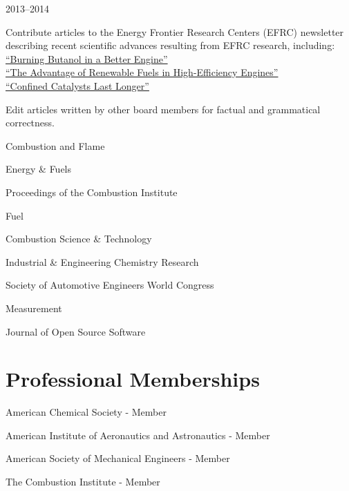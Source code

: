 \begin{lonelist}
\item[]  \hfill 2013--2014\\

\begin{innerlist}
\item Contribute articles to the Energy Frontier Research Centers (EFRC)
newsletter describing recent scientific advances resulting from
EFRC research, including:\\
\hspace*{0.25in}\href{http://www.energyfrontier.us/newsletter/201210/burning-butanol-better-engine}
{``Burning Butanol in a Better Engine''}\\
\hspace*{0.25in}\href{http://www.energyfrontier.us/newsletter/201401/advantage-renewable-fuels-high-efficiency-engines}
{``The Advantage of Renewable Fuels in High-Efficiency Engines''}\\
\hspace*{0.25in}\href{http://www.energyfrontier.us/newsletter/201404/confined-catalysts-last-longer}
{``Confined Catalysts Last Longer''}
\item Edit articles written by other board members for factual and grammatical correctness.
\end{innerlist}

\item[] 
   \begin{innerlist}
       \item Combustion and Flame
       \item Energy \& Fuels
       \item Proceedings of the Combustion Institute
       \item Fuel
       \item Combustion Science \& Technology
       \item Industrial \& Engineering Chemistry Research
       \item Society of Automotive Engineers World Congress
       \item Measurement
       \item Journal of Open Source Software
   \end{innerlist}

\end{lonelist}

\section{{\sectionfont Professional Memberships}}
American Chemical Society - Member

American Institute of Aeronautics and Astronautics - Member

American Society of Mechanical Engineers - Member

The Combustion Institute - Member



